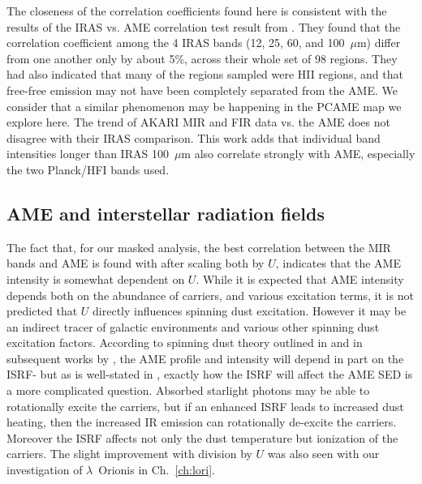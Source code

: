        The closeness of the correlation coefficients found here is consistent with the results of the IRAS vs. AME correlation test result from \cite{planckXV}. They found that the correlation coefficient among the 4 IRAS bands (12, 25, 60, and 100~$\mu$m) differ from one another only by about 5\%, across their whole set of 98 regions. They had also indicated that many of the regions sampled were HII regions, and that free-free emission may not have been completely separated from the AME. We consider that a similar phenomenon may be happening in the PCAME map we explore here. The trend of AKARI MIR and FIR data vs. the AME does not disagree with their IRAS comparison. This work adds that individual band intensities longer than IRAS 100~$\mu$m also correlate strongly with AME, especially the two Planck/HFI bands used.


          \subsection{AME and interstellar radiation fields}
            The fact that, for our masked analysis, the best correlation between the MIR bands and AME is found with after scaling both by $U$, indicates that the AME intensity is somewhat dependent on $U$. While it is expected that AME intensity depends both on the abundance of carriers, and various excitation terms, it is not predicted that $U$ directly influences spinning dust excitation. However it may be an indirect tracer of galactic environments and various other spinning dust excitation factors. According to spinning dust theory outlined in \cite{draine98a} and in subsequent works by \cite{ysard10a}, the AME profile and intensity will depend in part on the ISRF- but as is well-stated in \cite{hensley17a}, exactly how the ISRF will affect the AME SED is a more complicated question. Absorbed starlight photons may be able to rotationally excite the carriers, but if an enhanced ISRF leads to increased dust heating, then the increased IR emission can rotationally de-excite the carriers. Moreover the ISRF affects not only the dust temperature but ionization of the carriers. The slight improvement with division by $U$ was also seen with our investigation of $\lambda$~Orionis in Ch.~\ref{ch:lori}.

